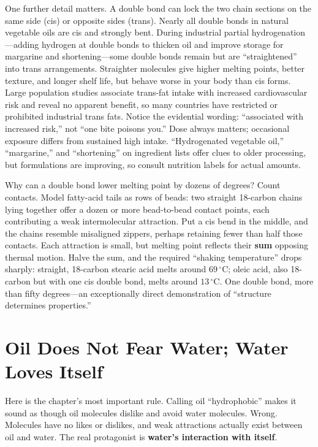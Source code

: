 One further detail matters. A double bond can lock the two chain sections on the same side (cis) or opposite sides (trans). Nearly all double bonds in natural vegetable oils are cis and strongly bent. During industrial partial hydrogenation---adding hydrogen at double bonds to thicken oil and improve storage for margarine and shortening---some double bonds remain but are ``straightened'' into trans arrangements. Straighter molecules give higher melting points, better texture, and longer shelf life, but behave worse in your body than cis forms. Large population studies associate trans-fat intake with increased cardiovascular risk and reveal no apparent benefit, so many countries have restricted or prohibited industrial trans fats. Notice the evidential wording: ``associated with increased risk,'' not ``one bite poisons you.'' Dose always matters; occasional exposure differs from sustained high intake. ``Hydrogenated vegetable oil,'' ``margarine,'' and ``shortening'' on ingredient lists offer clues to older processing, but formulations are improving, so consult nutrition labels for actual amounts.

\begin{qiaoliang}
Why can a double bond lower melting point by dozens of degrees? Count contacts. Model fatty-acid tails as rows of beads: two straight 18-carbon chains lying together offer a dozen or more bead-to-bead contact points, each contributing a weak intermolecular attraction. Put a cis bend in the middle, and the chains resemble misaligned zippers, perhaps retaining fewer than half those contacts. Each attraction is small, but melting point reflects their \textbf{sum} opposing thermal motion. Halve the sum, and the required ``shaking temperature'' drops sharply: straight, 18-carbon stearic acid melts around $69\,^{\circ}\mathrm{C}$; oleic acid, also 18-carbon but with one cis double bond, melts around $13\,^{\circ}\mathrm{C}$. One double bond, more than fifty degrees---an exceptionally direct demonstration of ``structure determines properties.''
\end{qiaoliang}

\section{Oil Does Not Fear Water; Water Loves Itself}

Here is the chapter's most important rule. Calling oil ``hydrophobic'' makes it sound as though oil molecules dislike and avoid water molecules. Wrong. Molecules have no likes or dislikes, and weak attractions actually exist between oil and water. The real protagonist is \textbf{water's interaction with itself}.

